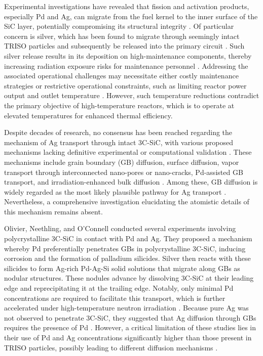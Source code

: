 \documentclass[%
preprint,
amsmath,amssymb,
aps,
]{revtex4-2}
\newcommand{\?}{\stackrel{?}{=}}
\begin{document}
Experimental investigations have revealed that fission and activation products, especially Pd and Ag, can migrate from the fuel kernel to the inner surface of the SiC layer, potentially compromising its structural integrity \cite{Verfondern2020}. Of particular concern is silver, which has been found to migrate through seemingly intact TRISO particles and subsequently be released into the primary circuit \cite{Verfondern2020,VanRooyen2014b}. Such silver release results in its deposition on high-maintenance components, thereby increasing radiation exposure risks for maintenance personnel \cite{VanDerMerwe2009}. Addressing the associated operational challenges may necessitate either costly maintenance strategies or restrictive operational constraints, such as limiting reactor power output and outlet temperature \cite{VanDerMerwe2009}. However, such temperature reductions contradict the primary objective of high-temperature reactors, which is to operate at elevated temperatures for enhanced thermal efficiency.

Despite decades of research, no consensus has been reached regarding the mechanism of Ag transport through intact 3C-SiC, with various proposed mechanisms lacking definitive experimental or computational validation \cite{VanRooyen2014}. These mechanisms include grain boundary (GB) diffusion, surface diffusion, vapor transport through interconnected nano-pores or nano-cracks, Pd-assisted GB transport, and irradiation-enhanced bulk diffusion \cite{VanRooyen2014, VanRooyen2014b}. Among these, GB diffusion is widely regarded as the most likely plausible pathway for Ag transport \cite{VanRooyen2014}. Nevertheless, a comprehensive investigation elucidating the atomistic details of this mechanism remains absent.

Olivier, Neethling, and O'Connell \cite{Olivier2012, Neethling2012, Olivier2013, OConnell2014} conducted several experiments involving polycrystalline 3C-SiC in contact with Pd and Ag. They proposed a mechanism whereby Pd preferentially penetrates GBs in polycrystalline 3C-SiC, inducing corrosion and the formation of palladium silicides. Silver then reacts with these silicides to form Ag-rich Pd-Ag-Si solid solutions that migrate along GBs as nodular structures. These nodules advance by dissolving 3C-SiC at their leading edge and reprecipitating it at the trailing edge. Notably, only minimal Pd concentrations are required to facilitate this transport, which is further accelerated under high-temperature neutron irradiation \cite{OConnell2014}. Because pure Ag was not observed to penetrate 3C-SiC, they suggested that Ag diffusion through GBs requires the presence of Pd \cite{Neethling2012}. However, a critical limitation of these studies lies in their use of Pd and Ag concentrations significantly higher than those present in TRISO particles, possibly leading to different diffusion mechanisms \cite{VanRooyen2014b}.
\end{document}
